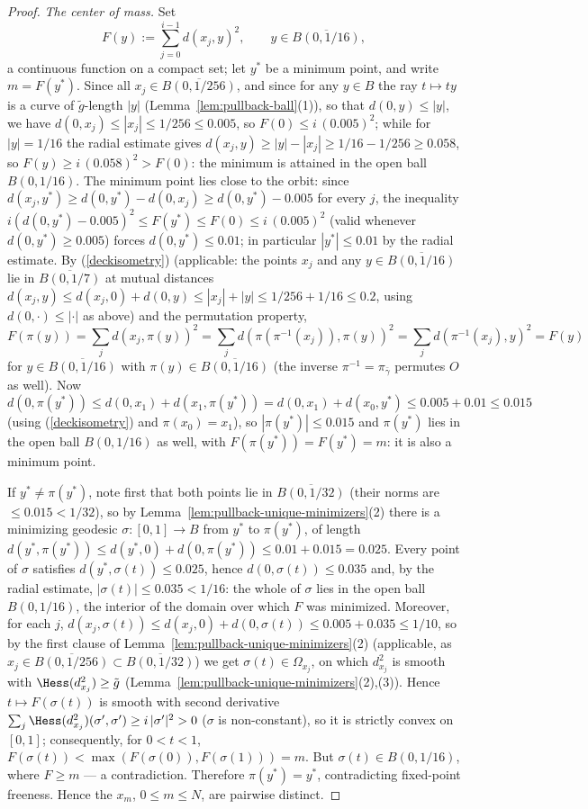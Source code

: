 \begin{proof}
\emph{The center of mass.} Set
$$F(y):=\sum_{j=0}^{i-1}d\left(x_j,y\right)^2,
\qquad y\in\overline{B(0,1/16)},$$
a continuous function on a compact set; let $y^*$ be a minimum
point, and write $m=F(y^*)$. Since all
$x_j\in\overline{B(0,1/256)}$, and since for any $y\in B$ the ray
$t\mapsto ty$ is a curve of $\tilde g$-length $|y|$
(Lemma~\ref{lem:pullback-ball}(1)), so that $d(0,y)\le|y|$, we
have $d(0,x_j)\le|x_j|\le1/256\le0.005$, so $F(0)\le
i\,(0.005)^2$; while for $|y|=1/16$ the radial estimate gives
$d(x_j,y)\ge|y|-|x_j|\ge1/16-1/256\ge 0.058$, so
$F(y)\ge i\,(0.058)^2>F(0)$: the minimum is attained in the open
ball $B(0,1/16)$. The minimum point lies close to the orbit: since
$d(x_j,y^*)\ge d(0,y^*)-d(0,x_j)\ge d(0,y^*)-0.005$ for every
$j$, the inequality
$i\left(d(0,y^*)-0.005\right)^2\le F(y^*)\le F(0)\le
i\,(0.005)^2$ (valid whenever $d(0,y^*)\ge0.005$) forces
$d(0,y^*)\le0.01$; in particular $|y^*|\le0.01$ by the radial
estimate. By (\ref{deckisometry}) (applicable: the points
$x_{j}$ and any $y\in\overline{B(0,1/16)}$ lie in
$\overline{B(0,1/7)}$ at mutual distances
$d(x_j,y)\le d(x_j,0)+d(0,y)\le|x_j|+|y|
\le1/256+1/16\le0.2$, using $d(0,\cdot)\le|\cdot|$ as above) and
the permutation property,
$$F(\pi(y))=\sum_jd\left(x_j,\pi(y)\right)^2
=\sum_jd\left(\pi\left(\pi^{-1}(x_j)\right),\pi(y)\right)^2
=\sum_jd\left(\pi^{-1}(x_j),y\right)^2=F(y)$$
for $y\in\overline{B(0,1/16)}$ with $\pi(y)\in
\overline{B(0,1/16)}$ (the inverse $\pi^{-1}=\pi_{\bar\gamma}$
permutes $O$ as well). Now
$d(0,\pi(y^*))\le d(0,x_1)+d(x_1,\pi(y^*))
=d(0,x_1)+d(x_0,y^*)\le0.005+0.01\le0.015$ (using
(\ref{deckisometry}) and $\pi(x_0)=x_1$), so
$|\pi(y^*)|\le0.015$ and $\pi(y^*)$ lies in the open ball
$B(0,1/16)$ as well, with $F(\pi(y^*))=F(y^*)=m$: it is also a
minimum point.

If $y^*\not=\pi(y^*)$, note first that both points lie in
$\overline{B(0,1/32)}$ (their norms are $\le0.015<1/32$), so by
Lemma~\ref{lem:pullback-unique-minimizers}(2) there is a
minimizing geodesic $\sigma\colon[0,1]\to B$ from $y^*$ to
$\pi(y^*)$, of length $d(y^*,\pi(y^*))\le
d(y^*,0)+d(0,\pi(y^*))\le0.01+0.015=0.025$. Every point of
$\sigma$ satisfies $d(y^*,\sigma(t))\le0.025$, hence
$d(0,\sigma(t))\le0.035$ and, by the radial estimate,
$|\sigma(t)|\le0.035<1/16$: the whole of $\sigma$ lies in the open
ball $B(0,1/16)$, the interior of the domain over which $F$ was
minimized. Moreover, for each $j$,
$d\left(x_j,\sigma(t)\right)\le d(x_j,0)+d(0,\sigma(t))
\le0.005+0.035\le1/10$, so by the first clause of
Lemma~\ref{lem:pullback-unique-minimizers}(2) (applicable, as
$x_j\in\overline{B(0,1/256)}\subset\overline{B(0,1/32)}$) we get
$\sigma(t)\in\Omega_{x_j}$, on which $d_{x_j}^2$ is smooth with
$\Hess(d_{x_j}^2)\ge\tilde g$
(Lemma~\ref{lem:pullback-unique-minimizers}(2),(3)). Hence $t\mapsto
F(\sigma(t))$ is smooth with second derivative
$\sum_j\Hess(d_{x_j}^2)(\sigma',\sigma')\ge
i\,|\sigma'|^2>0$ ($\sigma$ is non-constant), so it is strictly
convex on $[0,1]$; consequently, for $0<t<1$,
$F(\sigma(t))<\max\left(F(\sigma(0)),F(\sigma(1))\right)=m$. But
$\sigma(t)\in B(0,1/16)$, where $F\ge m$ --- a contradiction.
Therefore $\pi(y^*)=y^*$, contradicting fixed-point freeness.
Hence the $x_m$, $0\le m\le N$, are pairwise distinct.
\end{proof}

